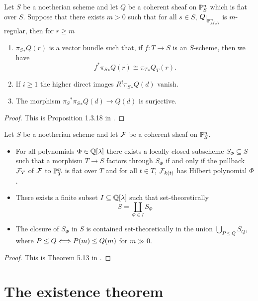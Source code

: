 \begin{proposition}\label{RegularityInFamilies}
Let $S$ be a noetherian scheme and let $Q$ be a coherent sheaf on $\mathbb{P}^n_S$ which is flat over $S$. Suppose that there exists $m>0$ such that for all $s\in S$, $Q\res{\Pj^n_{k(s)}}$ is $m$-regular, then for $r\geq m$
\begin{enumerate}
\item ${\pi_S}_\ast Q(r)$ is a vector bundle such that, if $f:T\to S$ is an $S$-scheme, then we have
\[f^\ast{\pi_S}_\ast Q(r)\cong {\pi_T}_\ast Q_T(r).\]
\item If $i\geq 1$ the higher direct images $R^i{\pi_S}_\ast Q(d)$ vanish.
\item The morphism ${\pi_S}^\ast{\pi_S}_\ast Q(d)\to Q(d)$ is surjective.
\end{enumerate}
\end{proposition}
\begin{proof}
This is Proposition 1.3.18 in \cite{Alper}.
\end{proof}


\begin{theorem}\label{FlatetningStratifications}
Let $S$ be a noetherian scheme and let $\mathcal{F}$ be a coherent sheaf on $\mathbb{P}^n_S$. 
\begin{itemize}
\item For all polynomials $\Phi\in\mathbb{Q}[\lambda]$ there exists a locally closed subscheme $S_\Phi\subseteq S$ such that a morphism $T\to S$ factors through $S_\Phi$ if and only if the pullback $\mathcal{F}_T$ of $\mathcal{F}$ to $\mathbb{P}^n_T$ is flat over $T$ and for all $t\in T$, $\mathcal{F}_{k(t)}$ has Hilbert polynomial $\Phi$.
\item There exists a finite subset $I\subseteq \mathbb{Q}[\lambda]$ such that set-theoretically
\[S=\coprod_{\Phi\in I}S_\Phi\]
\item The closure of $S_\Phi$ in $S$ is contained set-theoretically in the union $\bigcup_{P\leq Q}S_Q$,
where $P\leq Q\Longleftrightarrow P(m)\leq Q(m)$ for $m\gg 0$.
\end{itemize}
\end{theorem}
\begin{proof}
This is Theorem 5.13 in \cite{FGAEXPLAINED}.
\end{proof}



\section{The existence theorem}

